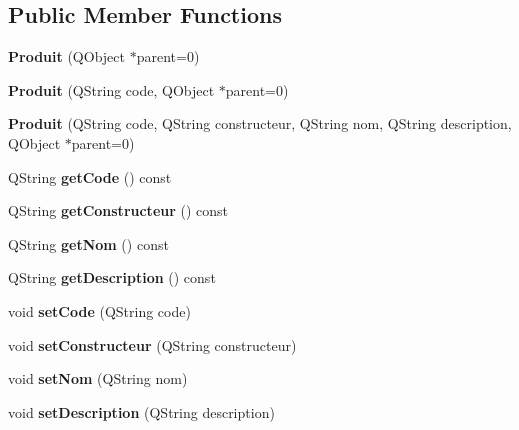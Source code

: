 \subsection*{Public Member Functions}
\begin{DoxyCompactItemize}
\item 
\hypertarget{class_produit_afdd31f8217342cf98d1b0a0612777127}{
{\bfseries Produit} (QObject $\ast$parent=0)}
\label{class_produit_afdd31f8217342cf98d1b0a0612777127}

\item 
\hypertarget{class_produit_a96a6eef1c04e1662f8cc33432594de15}{
{\bfseries Produit} (QString code, QObject $\ast$parent=0)}
\label{class_produit_a96a6eef1c04e1662f8cc33432594de15}

\item 
\hypertarget{class_produit_af6cc96a0203af35fad57858495012bb8}{
{\bfseries Produit} (QString code, QString constructeur, QString nom, QString description, QObject $\ast$parent=0)}
\label{class_produit_af6cc96a0203af35fad57858495012bb8}

\item 
\hypertarget{class_produit_aecf46c16362add086f0bb1531b695c23}{
QString {\bfseries getCode} () const }
\label{class_produit_aecf46c16362add086f0bb1531b695c23}

\item 
\hypertarget{class_produit_a82da5f8efa1405c36b1380ee399921b5}{
QString {\bfseries getConstructeur} () const }
\label{class_produit_a82da5f8efa1405c36b1380ee399921b5}

\item 
\hypertarget{class_produit_a4cb3c7edf6856a560e9088596b6b0b45}{
QString {\bfseries getNom} () const }
\label{class_produit_a4cb3c7edf6856a560e9088596b6b0b45}

\item 
\hypertarget{class_produit_a0d6c0e6ca3c76fcdd03b5783d043be3b}{
QString {\bfseries getDescription} () const }
\label{class_produit_a0d6c0e6ca3c76fcdd03b5783d043be3b}

\item 
\hypertarget{class_produit_adafca55c25ea2bee065557a95ed9ee08}{
void {\bfseries setCode} (QString code)}
\label{class_produit_adafca55c25ea2bee065557a95ed9ee08}

\item 
\hypertarget{class_produit_a1301bb612ce0c2c40a03c411c6ba12d9}{
void {\bfseries setConstructeur} (QString constructeur)}
\label{class_produit_a1301bb612ce0c2c40a03c411c6ba12d9}

\item 
\hypertarget{class_produit_a8747759c26177afeecb116873e39cacc}{
void {\bfseries setNom} (QString nom)}
\label{class_produit_a8747759c26177afeecb116873e39cacc}

\item 
\hypertarget{class_produit_a31c004da80561f48e4542db30a584060}{
void {\bfseries setDescription} (QString description)}
\label{class_produit_a31c004da80561f48e4542db30a584060}

\end{DoxyCompactItemize}
